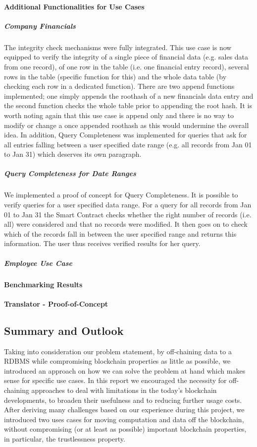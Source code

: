 \paragraph{Additional Functionalities for Use Cases}
\subparagraph{Company Financials}
The integrity check mechanisms were fully integrated. This use case is now equipped to verify the integrity of a single piece of financial data (e.g. sales data from one record), of one row in the table (i.e. one financial entry record), several rows in the table (specific function for this) and the whole data table (by checking each row in a dedicated function).
There are two append functions implemented; one simply appends the roothash of a new financials data entry and the second function checks the whole table prior to appending the root hash. It is worth noting again that this use case is append only and there is no way to modify or change a once appended roothash as this would undermine the overall idea.
In addition, Query Completeness was implemented for queries that ask for all entries falling between a user specified date range (e.g. all records from Jan 01 to Jan 31) which deserves its own paragraph.

\subparagraph{Query Completeness for Date Ranges}
We implemented a proof of concept for Query Completeness. It is possible to verify queries for a user specified data range. For a query for all records from Jan 01 to Jan 31 the Smart Contract checks whether the right number of records (i.e. all) were considered and that no records were modified. It then goes on to check which of the records fall in between the user specified range and returns this information. The user thus receives verified results for her query.

\subparagraph{Employee Use Case}

\paragraph{Benchmarking Results}

\paragraph{Translator - Proof-of-Concept}


\subsection{Summary and Outlook}
Taking into consideration our problem statement, by off-chaining data to a RDBMS while compromising blockchain properties as little as possible, we introduced an approach on how we can solve the problem at hand which makes sense for specific use cases. In this report we encouraged the necessity for off-chaining approaches to deal with limitations in the today’s blockchain developments, to broaden their usefulness and to reducing further usage costs. After deriving many challenges based on our experience during this project, we introduced two uses cases for moving computation and data off the blockchain, without compromising (or at least as possible) important blockchain properties, in particular, the trustlessness property.

